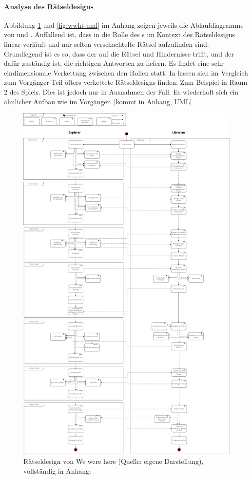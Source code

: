 \paragraph{Analyse des Rätseldesigns}
Abbildung \ref{fig:wwh-uml} und \ref{fig:wwht-uml} im Anhang zeigen jeweils die Ablaufdiagramme von  und . Auffallend ist, dass in  die Rolle des s im Kontext des Rätseldesigns linear verläuft und nur selten verschachtelte Rätsel aufzufinden sind. Grundlegend ist es so, dass der  auf die Rätsel und Hindernisse trifft, und der  dafür zuständig ist, die richtigen Antworten zu liefern. Es findet eine sehr eindimensionale Verkettung zwischen den Rollen statt.
In  lassen sich im Vergleich zum Vorgänger-Teil öfters verkettete Rätseldesigns finden. Zum Beispiel in Raum 2 des Spiels. Dies ist jedoch nur in Ausnahmen der Fall. Es wiederholt sich ein ähnlicher Aufbau wie im Vorgänger.
[kommt in Anhang, UML]

\begin{figure}[ht]
\centering
\includegraphics[width=0.8\linewidth]{content/pictures/WeWereHereUML.png}
\caption{Rätseldesign von We were here (Quelle: eigene Darstellung), vollständig in Anhang: }
\label{fig:wwh-uml}
\end{figure}

